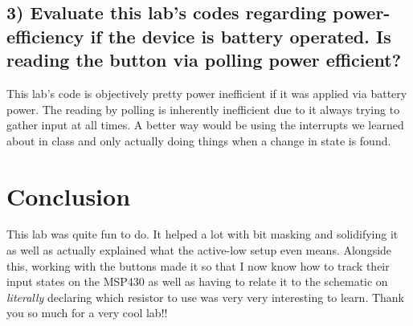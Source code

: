 \documentclass{article}
\begin{document}
\subsection{3) Evaluate this lab’s codes regarding power-efficiency if the device is battery operated. Is reading the button via polling power efficient?}
This lab's code is objectively pretty power inefficient if it was applied via battery power. The reading by polling is inherently inefficient due to it always trying to gather input at all times. A better way would be using the interrupts we learned about in class and only actually doing things when a change in state is found.

\section{Conclusion}
This lab was quite fun to do. It helped a lot with bit masking and solidifying it as well as actually explained what the active-low setup even means. Alongside this, working with the buttons made it so that I now know how to track their input states on the MSP430 as well as having to relate it to the schematic on \textit{literally} declaring which resistor to use was very very interesting to learn. Thank you so much for a very cool lab!!
\end{document}

